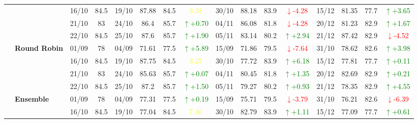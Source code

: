 \documentclass{ieeeaccess}
\begin{document}
{\begin{longtable}{llcc|cccc|cccc|cccc}
&
& 16/10 & 84.5 & 19/10 & 87.88 & 84.5 & \textcolor{yellow}{3.38} & 30/10 & 88.18 & 83.9 & \textcolor{red}{\(\downarrow\)-4.28} & 15/12 & 81.35 & 77.7 & \textcolor{green}{\(\uparrow\)+3.65} \\

&
& 21/10 & 83 & 24/10 & 86.4 & 85.7 & \textcolor{green}{\(\uparrow\)+0.70} & 04/11 & 86.08 & 81.8 & \textcolor{red}{\(\downarrow\)-4.28} & 20/12 & 81.23 & 82.9 & \textcolor{green}{\(\uparrow\)+1.67} \\

&
& 22/10 & 84.5 & 25/10 & 87.6 & 85.7 & \textcolor{green}{\(\uparrow\)+1.90} & 05/11 & 83.14 & 80.2 & \textcolor{green}{\(\uparrow\)+2.94} & 21/12 & 87.42 & 82.9 & \textcolor{red}{\(\downarrow\)-4.52} \\
\cmidrule(lr){2-16}


& \textbf{Round Robin}
& 01/09 & 78 & 04/09 & 71.61 & 77.5 & \textcolor{green}{\(\uparrow\)+5.89} & 15/09 & 71.86 & 79.5 & \textcolor{red}{\(\downarrow\)-7.64} & 31/10 & 78.62 & 82.6 & \textcolor{green}{\(\uparrow\)+3.98} \\

&
& 16/10 & 84.5 & 19/10 & 87.75 & 84.5 & \textcolor{yellow}{3.25} & 30/10 & 77.72 & 83.9 & \textcolor{green}{\(\uparrow\)+6.18} & 15/12 & 77.81 & 77.7 & \textcolor{green}{\(\uparrow\)+0.11} \\

&
& 21/10 & 83 & 24/10 & 85.63 & 85.7 & \textcolor{green}{\(\uparrow\)+0.07} & 04/11 & 80.45 & 81.8 & \textcolor{green}{\(\uparrow\)+1.35} & 20/12 & 82.69 & 82.9 & \textcolor{green}{\(\uparrow\)+0.21} \\

&
& 22/10 & 84.5 & 25/10 & 87.2 & 85.7 & \textcolor{green}{\(\uparrow\)+1.50} & 05/11 & 79.27 & 80.2 & \textcolor{green}{\(\uparrow\)+0.93} & 21/12 & 78.35 & 82.9 & \textcolor{green}{\(\uparrow\)+4.55} \\
\cmidrule(lr){2-16}




& \textbf{Ensemble}
& 01/09 & 78 & 04/09 & 77.31 & 77.5 & \textcolor{green}{\(\uparrow\)+0.19} & 15/09 & 75.71 & 79.5 & \textcolor{red}{\(\downarrow\)-3.79} & 31/10 & 76.21 & 82.6 & \textcolor{red}{\(\downarrow\)-6.39} \\

&
& 16/10 & 84.5 & 19/10 & 77.04 & 84.5 & \textcolor{yellow}{7.46} & 30/10 & 82.79 & 83.9 & \textcolor{green}{\(\uparrow\)+1.11} & 15/12 & 77.09 & 77.7 & \textcolor{green}{\(\uparrow\)+0.61} \\


\end{longtable}}
\end{document}
